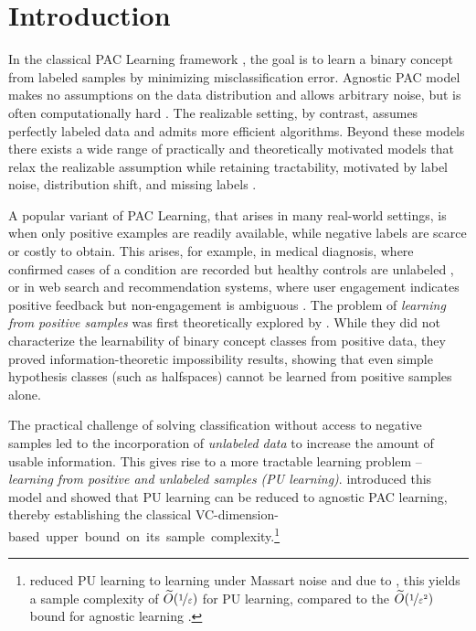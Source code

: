 \documentclass[11pt]{article}
\theoremstyle{plain}
\theoremstyle{definition}
\theoremstyle{remark}
\newcommand{\nfrac}[2]{\nicefrac{#1}{#2}}
\newcommand{\eps}{\varepsilon}
\newcommand{\wt}[1]{\widetilde{#1}}
\begin{document}
\clearpage

\thispagestyle{empty}
{   
    \tableofcontents
}
\thispagestyle{empty}

\clearpage
{}
    
\section{Introduction} \label{sec:intro}
    \vspace{-2mm}
    
     In the classical PAC Learning framework \cite{valiant1984theory}, the goal is to learn a binary concept from labeled samples by minimizing misclassification error. Agnostic PAC model makes no assumptions on the data distribution and allows arbitrary noise, but is often computationally hard \cite{guruswami2009hardness, feldman2006new, daniely2016complexity}. The realizable setting, by contrast, assumes perfectly labeled data and admits more efficient algorithms. Beyond these models there exists a wide range of practically and theoretically motivated models that relax the realizable assumption while retaining tractability, motivated by label noise, distribution shift, and missing labels \cite{massartNoise2006, yishay_2009_domain_adapt, hanneke_kpotufe_2019_transfer_exp}. %

     A popular variant of PAC Learning, that arises in many real-world settings, is when only positive examples are readily available, while negative labels are scarce or costly to obtain. This arises, for example, in medical diagnosis, where confirmed cases of a condition are recorded but healthy controls are unlabeled \cite{elkan2008pu}, or in web search and recommendation systems, where user engagement indicates positive feedback but non-engagement is ambiguous \cite{liu2003building}. The problem of \textit{learning from positive samples} was first theoretically explored by \citet{natarajan1987learning}. While they did not characterize the learnability of binary concept classes from positive data, they proved information-theoretic impossibility results, showing that even simple hypothesis classes (such as halfspaces) cannot be learned from positive samples alone. 
 
     
     The practical challenge of solving classification without access to negative samples led to the incorporation of \textit{unlabeled data} to increase the amount of usable information. 
     This gives rise to a more tractable learning problem -- \textit{learning from positive and unlabeled samples (PU learning)}. \citet{denis1990positive} introduced this model and showed that PU learning can be reduced to agnostic PAC learning, thereby establishing the classical VC-\mbox{dimension-based upper bound on its sample complexity.}\footnote{\citet{denis1990positive} reduced PU learning to learning under Massart noise and due to \citet{massartNoise2006}, this yields a sample complexity of $\wt{O}(\nfrac{1}{\eps})$ for PU learning, compared to the $\wt{O}(\nfrac{1}{\eps^2})$ bound for agnostic learning \cite{kearns1992toward}.}
 
\end{document}
